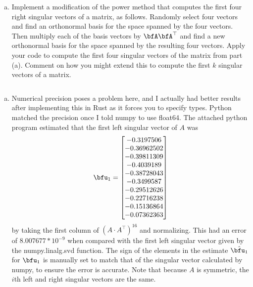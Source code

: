 \begin{homework}[e]
\begin{enumerate}[(a)]
      \item Implement a modification of the power method that computes the first four right singular vectors of a matrix, as follows. Randomly select four vectors and find an orthonormal basis for the space spanned by the four vectors. Then multiply each of the basis vectors by $\bfA\bfA^\top$ and find a new orthonormal basis for the space spanned by the resulting four vectors. Apply your code to compute the first four singular vectors of the matrix from part (a). Comment on how you might extend this to compute the first $k$ singular vectors of a matrix.
  \end{enumerate}
  \begin{soln}$ $
    \begin{enumerate}[(a)]
      \item Numerical precision poses a problem here, and I actually had better results after implementing this in Rust as it forces you to specify types. Python matched the precision once I told numpy to use float64. The attached python program estimated that the first left singular vector of $A$ was
        \begin{align*} \bfu_1 = 
          \begin{bmatrix}
            -0.3197506\\
            -0.36962502\\
            -0.39811309\\
            -0.4039189\\
            -0.38728043\\
            -0.3499587\\
            -0.29512626\\
            -0.22716238\\
            -0.15136864\\
            -0.07362363
          \end{bmatrix} 
        \end{align*}
        by taking the first column of $(A\cdot A^\top)^{16}$ and normalizing. This had an error of $8.007677*10^{-9}$ when compared with the first left singular vector given by the numpy.linalg.svd function. The sign of the elements in the estimate $\hat{\bfu_1}$ for $\bfu_1$ is manually set to match that of the singular vector calculated by numpy, to ensure the error is accurate. Note that because $A$ is symmetric, the $i$th left and right singular vectors are the same.


\end{enumerate}
\end{soln}
\end{homework}
